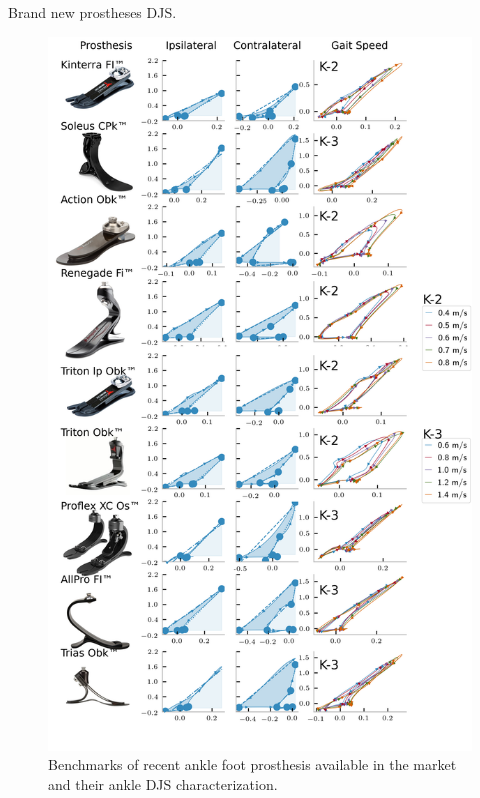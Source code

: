 \documentclass[10pt]{beamer}
\begin{document}
\begin{frame}{Brand new prostheses DJS.}
\begin{footnotesize}
\begin{figure}
\centerline{\includegraphics[scale=0.28]{Feathergraphics/prosthesisDJScomparison.png}}
\caption{\label{fig:benchmark} Benchmarks of recent ankle foot prosthesis available in the market and their ankle DJS characterization.}
\end{figure} 
\end{footnotesize}
\end{frame}
\end{document}
